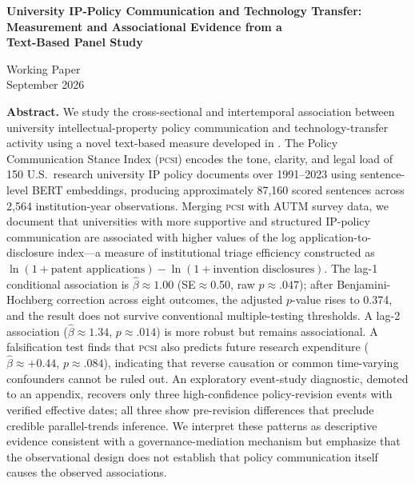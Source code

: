 \documentclass[12pt]{article}
\newcommand{\PCSI}{\textsc{pcsi}}
\begin{document}
\begin{titlepage}
\begin{center}
\vspace*{1.5cm}

{\LARGE \textbf{University IP-Policy Communication and Technology Transfer:}}\\[0.4em]
{\LARGE \textbf{Measurement and Associational Evidence from a}}\\[0.4em]
{\LARGE \textbf{Text-Based Panel Study}}

\vspace{1.2cm}



{\normalsize Working Paper \\ September 2026}

\vspace{1.5cm}

\begin{minipage}{0.85\textwidth}
\small
\textbf{Abstract.} We study the cross-sectional and intertemporal association between
university intellectual-property policy communication and technology-transfer activity
using a novel text-based measure developed in \citet{sharma2026pcsi}. The Policy Communication
Stance Index (\PCSI{}) encodes the tone, clarity, and legal load of 150 U.S.\ research
university IP policy documents over 1991--2023 using sentence-level BERT embeddings,
producing approximately 87,160 scored sentences across 2,564 institution-year observations.
Merging \PCSI{} with AUTM survey data, we document that universities with more
supportive and structured IP-policy communication are associated with higher values of
the log application-to-disclosure index---a measure of institutional triage efficiency
constructed as $\ln(1+\text{patent applications}) - \ln(1+\text{invention disclosures})$.
The lag-1 conditional association is $\hat\beta \approx 1.00$ (SE$\approx$0.50,
raw $p\approx.047$); after Benjamini-Hochberg correction across eight outcomes, the
adjusted $p$-value rises to 0.374, and the result does not survive conventional
multiple-testing thresholds. A lag-2 association ($\hat\beta \approx 1.34$, $p\approx.014$)
is more robust but remains associational. A falsification test finds that \PCSI{} also
predicts future research expenditure ($\hat\beta\approx+0.44$, $p\approx.084$), indicating
that reverse causation or common time-varying confounders cannot be ruled out. An
exploratory event-study diagnostic, demoted to an appendix, recovers only three
high-confidence policy-revision events with verified effective dates; all three show
pre-revision differences that preclude credible parallel-trends inference. We interpret
these patterns as descriptive evidence consistent with a governance-mediation mechanism
but emphasize that the observational design does not establish that policy communication
itself causes the observed associations.
\end{minipage}


\end{center}
\end{titlepage}
\end{document}
